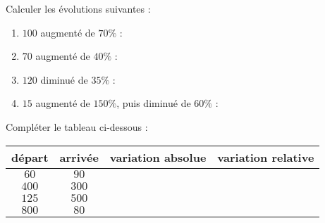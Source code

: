 \documentclass[
	classe=$2^{de}$,
	landscape,
	twocolumn,
	headerTitle={Interrogation}
]{évaluation}
\begin{document}
\begin{exercice}
	Calculer les évolutions suivantes :
	\begin{enumerate}
		\item $100$ augmenté de $70\%$ : 
		\item $70$ augmenté de $40\%$ : 
		\item $120$ diminué de $35\%$ : 
		\item $15$ augmenté de $150\%$, puis diminué de $60\%$ : 
	\end{enumerate}
\end{exercice}

\begin{exercice}
	Compléter le tableau ci-dessous :
	\begin{center}
		\begin{tabular}{|c|c|c|c|}
			\hline
			départ & arrivée & variation absolue   & variation relative   \\ \hline
			$60$   & $90$    & \correction{$30$}   & \correction{$0,5$}   \\ \hline
			$400$  & $300$   & \correction{$-200$} & \correction{$-0,25$} \\ \hline
			$125$  & $500$   & \correction{$375$}  & \correction{$3$}     \\ \hline
			$800$  & $80$    & \correction{$-720$} & \correction{$-0,9$}  \\ \hline
		\end{tabular}
	\end{center}
\end{exercice}
\end{document}
